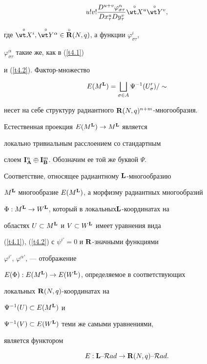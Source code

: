 \begin{pf}
\begin{align*}
{u!v!}


\frac{D^{u+v}\varphi^{\alpha}_{\sigma\tau}}{Dx^u_\tau Dy^v_\tau}


\puto{\wt X}{}^u\puto{\wt Y}{}^v,


\end{align*}


где $\puto{\wt X}{}^i,\puto{\wt Y}{}^\alpha\in


\puto{\R}(N,q)$, а функции $\varphi^i_{\sigma\tau}$,


$\varphi^\alpha_{\sigma\tau}$ такие же, как в (\ref{t4.1})


и (\ref{t4.2}). Фактор-множество


$$


{E}(M^\L)= \bigsqcup_{\sigma\in A}{\Psi}^{-1}({U}'_\sigma)/\sim


$$


несет на себе структуру радиантного ${\bold R}(N,q)^{n+m}$-многообразия.


Естественная проекция $E(M^{{\bold L}})\to M^{\bold L}$ является


локально тривиальным расслоением со стандартным


слоем ${\bold I}^n_{\bold A}\oplus{\bold I}^m_{\bold B}$. Обозначим ее той же буквой $\Psi$.


Соответствие, относящее радиантному ${\bold L}$-многообразию


$M^{{\bold L}}$ многообразие $E(M^{{\bold L}})$, а морфизму радиантных многообразий


$\Phi:M^{{\bold L}}\to W^{{\bold L}}$, который в локальных\linebreak ${\bold L}$-координатах на


областях $U\subset M^{\bold L}$ и $V\subset W^{{\bold L}}$ имеет уравнения вида


(\ref{t4.1}), (\ref{t4.2}) с $\psi^{i'}=0$ и ${\bold R}$-значными функциями


$\varphi^{i'}$, $\varphi^{\alpha'}$, --- отображение


$E(\Phi):E(M^{{\bold L}})\to E(W^{{\bold L}})$, определяемое в соответствующих


локальных ${\bold R}(N,q)$-координатах на


$\Psi^{-1}(U)\subset E(M^{\bold L})$ и


$\Psi^{-1}(V)\subset E(W^{{\bold L}})$ теми же самыми уравнениями,


является функтором


$$


{E}:{\L}\text{--}{\cal R}ad\to {\R}(N,q)\text{--}{\cal R}ad.


$$






\end{pf}
